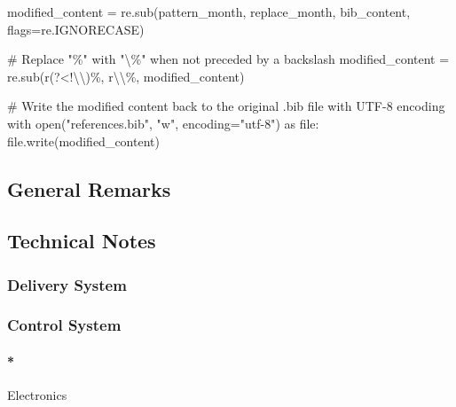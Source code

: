 \documentclass[
  letterpaper,
  DIV=11,
  numbers=noendperiod]{scrartcl}
\let\oldparagraph\paragraph
\renewcommand{\paragraph}[1]{\oldparagraph{#1}\mbox{}}
\newenvironment{Shaded}{\begin{snugshade}}{\end{snugshade}}
\newcommand{\BuiltInTok}[1]{\textcolor[rgb]{0.00,0.23,0.31}{#1}}
\newcommand{\CommentTok}[1]{\textcolor[rgb]{0.37,0.37,0.37}{#1}}
\newcommand{\ControlFlowTok}[1]{\textcolor[rgb]{0.00,0.23,0.31}{#1}}
\newcommand{\ImportTok}[1]{\textcolor[rgb]{0.00,0.46,0.62}{#1}}
\newcommand{\NormalTok}[1]{\textcolor[rgb]{0.00,0.23,0.31}{#1}}
\newcommand{\OperatorTok}[1]{\textcolor[rgb]{0.37,0.37,0.37}{#1}}
\newcommand{\StringTok}[1]{\textcolor[rgb]{0.13,0.47,0.30}{#1}}
\newcommand{\VerbatimStringTok}[1]{\textcolor[rgb]{0.13,0.47,0.30}{#1}}
\begin{document}
\begin{Shaded}
\begin{Highlighting}[]
\NormalTok{modified\_content }\OperatorTok{=}\NormalTok{ re.sub(pattern\_month, replace\_month, bib\_content, flags}\OperatorTok{=}\NormalTok{re.IGNORECASE)}

\CommentTok{\# Replace "\%" with "\textbackslash{}\%" when not preceded by a backslash}
\NormalTok{modified\_content }\OperatorTok{=}\NormalTok{ re.sub(}\VerbatimStringTok{r\textquotesingle{}(?\textless{}!\textbackslash{}\textbackslash{})\%\textquotesingle{}}\NormalTok{, }\VerbatimStringTok{r\textquotesingle{}\textbackslash{}\textbackslash{}\%\textquotesingle{}}\NormalTok{, modified\_content)}

\CommentTok{\# Write the modified content back to the original .bib file with UTF{-}8 encoding}
\ControlFlowTok{with} \BuiltInTok{open}\NormalTok{(}\StringTok{"references.bib"}\NormalTok{, }\StringTok{"w"}\NormalTok{, encoding}\OperatorTok{=}\StringTok{"utf{-}8"}\NormalTok{) }\ImportTok{as} \BuiltInTok{file}\NormalTok{:}
    \BuiltInTok{file}\NormalTok{.write(modified\_content)}
\end{Highlighting}
\end{Shaded}

\hypertarget{general-remarks}{%
\subsection{General Remarks}\label{general-remarks}}

\hypertarget{technical-notes}{%
\subsection{Technical Notes}\label{technical-notes}}

\hypertarget{delivery-system}{%
\subsubsection{Delivery System}\label{delivery-system}}

\hypertarget{control-system}{%
\subsubsection{Control System}\label{control-system}}

\hypertarget{electronics}{%
\paragraph*{Electronics}\label{electronics}}
\end{document}
